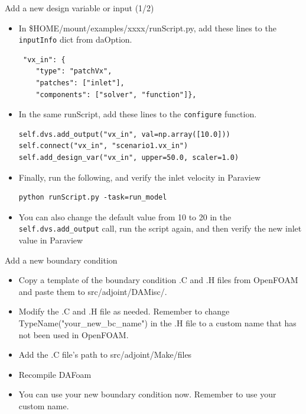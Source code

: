\documentclass{bredelebeamer}
\begin{document}
\begin{frame}[fragile]{Add a new design variable or input (1/2)}

\begin{itemize}
  \item In \$HOME/mount/examples/xxxx/runScript.py, add these lines to the \texttt{inputInfo} dict from daOption.
  \begin{lstlisting}
 "vx_in": {
    "type": "patchVx",
    "patches": ["inlet"],
    "components": ["solver", "function"]},
 \end{lstlisting}
 \item In the same runScript, add these lines to the \texttt{configure} function.
\begin{lstlisting}
self.dvs.add_output("vx_in", val=np.array([10.0]))
self.connect("vx_in", "scenario1.vx_in")
self.add_design_var("vx_in", upper=50.0, scaler=1.0)
 \end{lstlisting}
\item Finally, run the following, and verify the inlet velocity in Paraview
 \begin{lstlisting}
python runScript.py -task=run_model
\end{lstlisting}
\item You can also change the default value from 10 to 20 in the \texttt{self.dvs.add\_output} call, run the script again, and then verify the new inlet value in Paraview
\end{itemize}

\end{frame}


\begin{frame}[fragile]{Add a new boundary condition}

\begin{itemize}
  \item Copy a template of the boundary condition .C and .H files from OpenFOAM and paste them to src/adjoint/DAMisc/.
  \item Modify the .C and .H file as needed. Remember to change TypeName("your\_new\_bc\_name") in the .H file to a custom name that has not been used in OpenFOAM.
  \item Add the .C file's path to src/adjoint/Make/files
  \item Recompile DAFoam
  \item You can use your new boundary condition now. Remember to use your custom name.
\end{itemize}

\end{frame}
\end{document}
